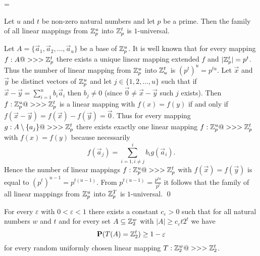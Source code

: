 


\magnification=

Let $u$ and $t$ be non-zero natural numbers and 
let $p$ be a prime.  Then the family of all linear mappings from 
$\Bbb Z^u_p$ into $\Bbb Z_p^t$ is $1$-universal.  
\endproclaim

Let $A=\{\vec {a}_1,\vec {a}_2,\dots,\vec {a}_u\}$ be a base of $
\Bbb Z_p^u$. It is well 
known that for every mapping $f:A@>>>\Bbb Z_p^t$ there exists a 
unique linear mapping extended $f$ and $|\Bbb Z^t_p|=p^t$. Thus the 
number of linear mapping from $\Bbb Z_p^u$ into $\Bbb Z^t_u$ is $
(p^t)^u=p^{tu}$. Let 
$\vec {x}$ and $\vec {y}$ be distinct vectors of $\Bbb Z_p^u$ and let $
j\in \{1,2,\dots,u\}$ such 
that if $\vec {x}-\vec {y}=\sum_{i=1}^nb_i\vec {a}_i$ then $b_j\ne 
0$ (since $\vec {0}\ne\vec {x}-\vec {y}$ such $j$ 
exists). Then $f:\Bbb Z^u_p@>>>\Bbb Z_p^t$ is a 
linear mapping with $f(x)=f(y)$ if and only if 
$f(\vec {x}-\vec {y})=f(\vec {x})-f(\vec {y})=\vec {0}$. Thus for every mapping 
$g:A\setminus \{a_j\}@>>>\Bbb Z_p^t$ there exists exactly one linear mapping 
$f:\Bbb Z^u_p@>>>\Bbb Z^t_p$ with $f(x)=f(y)$ because necessarily
$$f(\vec {a}_j)=\sum_{i=1,i\ne j}^ib_ig(\vec {a}_i).$$
Hence the number of linear mappings $f:\Bbb Z^u_p@>>>\Bbb Z_p^t$ with 
$f(\vec {x})=f(\vec {y})$ is equal to $(p^t)^{u-1}=p^{t(u-1)}$. From $
p^{t(u-1)}=\frac {p^{tu}}{p^t}$ it 
follows that the family of all linear mappings from $\Bbb Z^u_p$ into 
$\Bbb Z^T_p$ is $1$-universal. \qed
\enddemo

For every $\varepsilon$ with $0<\varepsilon <
1$ there exists a 
constant $c_{\varepsilon}>0$ such that for all natural numbers $w$ and $
t$ 
and for every set $A\subseteq \Bbb Z_2^w$ with $|A|\ge c_{\varepsilon}
t2^t$ we have 
$$\bold P(T(A)=\Bbb Z^t_2)\ge 1-\varepsilon$$
for every random uniformly chosen linear mapping 
$T:\Bbb Z_2^w@>>>\Bbb Z^t_2$.
\endproclaim

